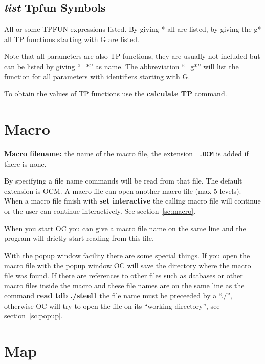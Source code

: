 \documentclass[11pt]{article}
\begin{document}
\hypertarget{List TPfun}{}
\subsection{{\em list} Tpfun Symbols}

All or some TPFUN expressions listed.  By giving * all are listed,
by giving the g* all TP functions starting with G are listed.

Note that all parameters are also TP functions, they are usually not
included but can be listed by giving ``\_*'' as name.  The
abbreviation ``\_g*'' will list the function for all parameters with
identifiers starting with G.

To obtain the values of TP functions use the {\bf calculate TP}
command.

\hypertarget{Macro}{}
\hypertarget{MACRO file}{}
\section{Macro }

{\bf Macro filename:} the name of the macro file, the extension {\tt
  .OCM} is added if there is none.

By specifying a file name commands will be read from that file.  The
default extension is OCM.  A macro file can open another macro file
(max 5 levels).  When a macro file finish with {\bf set interactive}
the calling macro file will continue or the user can continue
interactively.  See section~\ref{sc:macro}.

When you start OC you can give a macro file name on the same line and
the program will drictly start reading from this file.

With the popup window facility there are some special things.  If you
open the macro file with the popup window OC will save the directory
where the macro file was found.  If there are references to other
files such as datbases or other macro files inside the macro and these
file names are on the same line as the command {\bf read tdb ./steel1}
the file name must be preceeded by a ``./'', otherwise OC will try to
open the file on its ``working directory'', see
section~\ref{sc:popup}.

\hypertarget{Map}{}
\hypertarget{Map old data}{}
\section{Map }\label{sc:map}
\end{document}
